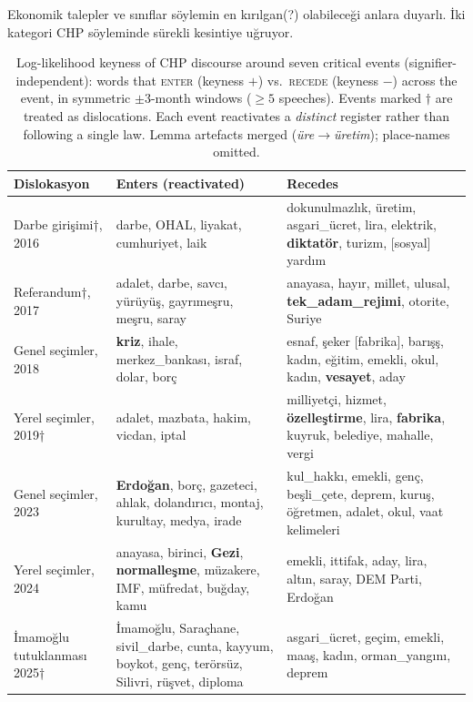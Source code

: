 \begin{bulgu}{Ekonomik talepler ve sınıflar söylemin en kırılgan(?) olabileceği anlara duyarlı. İki kategori CHP
  söyleminde sürekli kesintiye uğruyor.}
\begin{table}[htbp]
\centering
\small
\setlength{\tabcolsep}{4pt}
\caption{Log-likelihood keyness of CHP discourse around seven critical events (signifier-independent): words that \textsc{enter} (keyness $+$) vs.\ \textsc{recede} (keyness $-$) across the event, in symmetric $\pm 3$-month windows ($\geq 5$ speeches). Events marked $\dagger$ are treated as dislocations. Each event reactivates a \emph{distinct} register rather than following a single law. Lemma artefacts merged (\textit{üre}$\rightarrow$\textit{üretim}); place-names omitted.}
\label{tab:dislocation-all}
\begin{threeparttable}
\begin{tabular}{@{}>{\raggedright\arraybackslash}p{2.6cm} >{\raggedright\arraybackslash}p{5.3cm} >{\raggedright\arraybackslash}p{5.3cm}@{}}
\toprule
\textbf{Dislokasyon} & \textbf{Enters (reactivated)} & \textbf{Recedes} \\
\midrule
Darbe girişimi†, 2016 & darbe\tnote{a}, OHAL, liyakat, cumhuriyet, laik & dokunulmazlık, üretim\tnote{b}, asgari\_ücret, lira, elektrik, \textbf{diktatör}, turizm, [sosyal] yardım \\
\addlinespace
Referandum†, 2017 & adalet, darbe, savcı, yürüyüş, gayrımeşru, meşru, saray & anayasa, hayır, millet, ulusal, \textbf{tek\_adam\_rejimi}, otorite, Suriye \\
\addlinespace
Genel seçimler, 2018 & \textbf{kriz}, ihale, merkez\_bankası, israf, dolar, borç & esnaf, şeker [fabrika], barışş, kadın, eğitim, emekli, okul, kadın, \textbf{vesayet}, aday \\
\addlinespace
Yerel seçimler, 2019† & adalet, mazbata, hakim, vicdan, iptal & milliyetçi, hizmet, \textbf{özelleştirme}, lira, \textbf{fabrika}, kuyruk, belediye, mahalle, vergi \\
\addlinespace
Genel seçimler, 2023 & \textbf{Erdoğan}, borç, gazeteci, ahlak, dolandırıcı, montaj, kurultay, medya, irade & kul\_hakkı, emekli, genç, beşli\_çete, deprem, kuruş, öğretmen, adalet, okul, vaat kelimeleri\tnote{c} \\
\addlinespace
Yerel seçimler, 2024 & anayasa, birinci, \textbf{Gezi}, \textbf{normalleşme}, müzakere, IMF, müfredat, buğday, kamu & emekli, ittifak, aday, lira, altın, saray, DEM Parti, Erdoğan \\
\addlinespace
İmamoğlu tutuklanması 2025† & İmamoğlu, Saraçhane, sivil\_darbe, cunta, kayyum, boykot, genç, terörsüz, Silivri, rüşvet, diploma & asgari\_ücret, geçim, emekli, maaş, kadın, orman\_yangını, deprem\tnote{d} \\

\end{tabular}
\end{threeparttable}
\end{table}
\end{bulgu}
